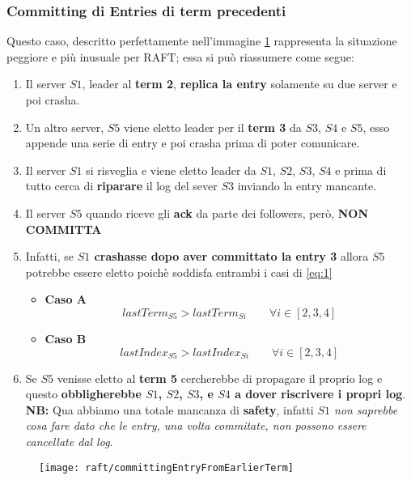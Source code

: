   \subsubsection{Committing di Entries di term precedenti}
  Questo caso, descritto perfettamente nell'immagine \ref{fig:figure12} rappresenta la situazione peggiore e più inusuale per RAFT; essa si può riassumere come segue:
  \begin{enumerate}
    \item{Il server $S1$, leader al \textbf{term 2}, \textbf{replica la entry} solamente su due server e poi crasha.}
    \item{Un altro server, $S5$ viene eletto leader per il \textbf{term 3} da $S3$, $S4$ e $S5$, esso appende una serie di entry e poi crasha prima di poter comunicare.}
    \item{Il server $S1$ si risveglia e viene eletto leader da $S1$, $S2$, $S3$, $S4$ e prima di tutto cerca di \textbf{riparare} il log del sever $S3$ inviando la entry mancante.}
    \item{Il server $S5$ quando riceve gli \textbf{ack} da parte dei followers, però, \textbf{NON COMMITTA}}
    \item{Infatti, se \textbf{$S1$ crashasse dopo aver committato la entry 3} allora $S5$ potrebbe essere eletto poichè soddisfa entrambi i casi di \ref{eq:1}}
    \begin{itemize}
      \item{\textbf{Caso A}}
      \[
        lastTerm_{S5} > lastTerm_{Si} \qquad \forall i \in [2,3,4]
      \]
      \item{\textbf{Caso B}}
      \[
        lastIndex_{S5} > lastIndex_{Si} \qquad \forall i \in [2,3,4]
      \]
    \end{itemize}
    \item{Se $S5$ venisse eletto al \textbf{term 5} cercherebbe di propagare il proprio log e questo \textbf{obbligherebbe $S1$, $S2$, $S3$, e $S4$ a dover riscrivere i propri log}.\\
    \textbf{NB:} Qua abbiamo una totale mancanza di \textbf{safety}, infatti \emph{$S1$ non saprebbe cosa fare dato che le entry, una volta commitate, non possono essere cancellate dal log}}.
  \end{enumerate}
  \begin{figure}[H]
    \centering
    \texttt{[image: raft/committingEntryFromEarlierTerm]}
    \caption[stateDiagramCaption]{}
    \label{fig:figure12}
  \end{figure}
